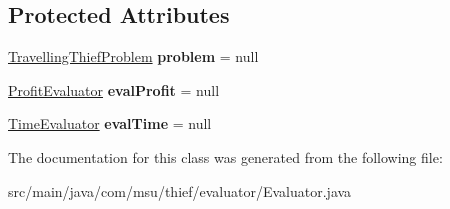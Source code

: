 \subsection*{Protected Attributes}
\begin{DoxyCompactItemize}
\item 
\hypertarget{classcom_1_1msu_1_1thief_1_1evaluator_1_1Evaluator_ac14bccab822220ede780c825a5fe3a78}{\hyperlink{classcom_1_1msu_1_1thief_1_1problems_1_1TravellingThiefProblem}{Travelling\-Thief\-Problem} {\bfseries problem} = null}\label{classcom_1_1msu_1_1thief_1_1evaluator_1_1Evaluator_ac14bccab822220ede780c825a5fe3a78}

\item 
\hypertarget{classcom_1_1msu_1_1thief_1_1evaluator_1_1Evaluator_a1a7984bc5332cfac89f627ff68ef64f0}{\hyperlink{classcom_1_1msu_1_1thief_1_1evaluator_1_1profit_1_1ProfitEvaluator}{Profit\-Evaluator} {\bfseries eval\-Profit} = null}\label{classcom_1_1msu_1_1thief_1_1evaluator_1_1Evaluator_a1a7984bc5332cfac89f627ff68ef64f0}

\item 
\hypertarget{classcom_1_1msu_1_1thief_1_1evaluator_1_1Evaluator_ad8291526450acab3521f300676caf060}{\hyperlink{classcom_1_1msu_1_1thief_1_1evaluator_1_1time_1_1TimeEvaluator}{Time\-Evaluator} {\bfseries eval\-Time} = null}\label{classcom_1_1msu_1_1thief_1_1evaluator_1_1Evaluator_ad8291526450acab3521f300676caf060}

\end{DoxyCompactItemize}


The documentation for this class was generated from the following file\-:\begin{DoxyCompactItemize}
\item 
src/main/java/com/msu/thief/evaluator/Evaluator.\-java\end{DoxyCompactItemize}
